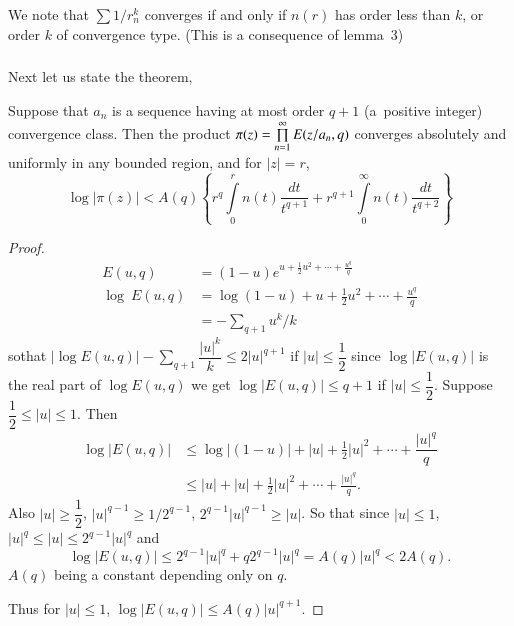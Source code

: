 We note that $\sum 1/r_{n}^{k}$ converges if and only if $n(r)$ has
order less than $k$, or order $k$ of convergence type. (This is a
consequence of lemma~3)

\subsubsection{}\label{part1-subsubsec1.9.1}
Next let us state the theorem,

\begin{thm}\label{part1-thm6}
Suppose that $a_{n}$ is a sequence having at most order $q+1$ 
(a~positive integer) convergence class. Then the product
$\pi(z)=\prod\limits^{\infty}_{n=1}\unskip\break E(z/a_{n},q)$ converges absolutely
and uniformly in any bounded region, and for $|z|=r$,
$$
\log|\pi(z)|<A(q)\left\{r^{q}\int\limits^{r}_{0}n(t)\dfrac{dt}{t^{q+1}}+r^{q+1}\int\limits^{\infty}_{0}n(t)\dfrac{dt}{t^{q+2}}\right\}
$$
\end{thm}

\begin{proof}
\begin{align*}
E(u,q) &= (1-u)e^{u+\frac{1}{2}u^{2}+\cdots+\frac{u^{q}}{q}}\\
\log \ E(u,q) &= \log(1-u)+u+\frac{1}{2}u^{2}+\cdots+\frac{u^{q}}{q}\\
&= -\sum_{q+1}u^{k}/k
\end{align*}
so\pageoriginale that $|\log
E(u,q)|-\sum\limits_{q+1}\dfrac{|u|^{k}}{k}\leq 2|u|^{q+1}$ if
$|u|\leq \dfrac{1}{2}$ since $\log|E(u,q)|$ is the real part of $\log
E(u,q)$ we get $\log|E(u,q)|\leq q+1$ if $|u|\leq
\dfrac{1}{2}$. Suppose $\dfrac{1}{2}\leq |u|\leq 1$. Then 
\begin{align*}
\log |E(u,q)| &\leq
\log|(1-u)|+|u|+\frac{1}{2}|u|^{2}+\cdots+\dfrac{|u|^{q}}{q}\\
&\leq |u|+|u|+\frac{1}{2}|u|^{2}+\cdots+\frac{|u|^{q}}{q}.
\end{align*}
Also $|u|\geq \dfrac{1}{2}$, $|u|^{q-1}\geq 1/2^{q-1}$,
$2^{q-1}|u|^{q-1}\geq |u|$. So that since $|u|\leq 1$, $|u|^{q}\leq
|u|\leq 2^{q-1}|u|^{q}$ and 
$$
\log|E(u,q)|\leq 2^{q-1}|u|^{q}+q2^{q-1}|u|^{q}=A(q)|u|^{q}<2A(q).
$$
$A(q)$ being a constant depending only on $q$. 

Thus for $|u|\leq 1$,
$\log|E(u,q)|\leq A(q)|u|^{q+1}$.
\end{proof}

